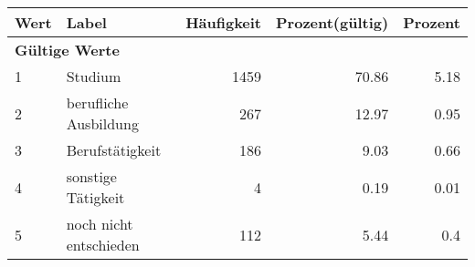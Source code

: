      \begin{longtable}{lXrrr}
     \toprule
     \textbf{Wert} & \textbf{Label} & \textbf{Häufigkeit} & \textbf{Prozent(gültig)} & \textbf{Prozent} \\
     \endhead
     \midrule
     \multicolumn{5}{l}{\textbf{Gültige Werte}}\\

     1 &
     \multicolumn{1}{X}{ Studium   } &


       \num{1459} &
       \num[round-mode=places,round-precision=2]{70,86} &
         \num[round-mode=places,round-precision=2]{5,18} \\

     2 &
     \multicolumn{1}{X}{ berufliche Ausbildung   } &


       \num{267} &
       \num[round-mode=places,round-precision=2]{12,97} &
         \num[round-mode=places,round-precision=2]{0,95} \\

     3 &
     \multicolumn{1}{X}{ Berufstätigkeit   } &


       \num{186} &
       \num[round-mode=places,round-precision=2]{9,03} &
         \num[round-mode=places,round-precision=2]{0,66} \\

     4 &
     \multicolumn{1}{X}{ sonstige Tätigkeit   } &


       \num{4} &
       \num[round-mode=places,round-precision=2]{0,19} &
         \num[round-mode=places,round-precision=2]{0,01} \\

     5 &
     \multicolumn{1}{X}{ noch nicht entschieden   } &


       \num{112} &
       \num[round-mode=places,round-precision=2]{5,44} &
         \num[round-mode=places,round-precision=2]{0,4} \\


\end{longtable}
